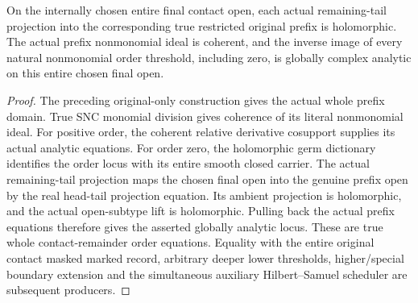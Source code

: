 \begin{theorem}
\label{hir:original-all-level-contact-remainder-prefix-analytic-equations}
\leanok
{}
On the internally chosen entire final contact open, each actual remaining-tail
projection into the corresponding true restricted original prefix is
holomorphic. The actual prefix nonmonomial ideal is coherent, and the inverse
image of every natural nonmonomial order threshold, including zero, is globally
complex analytic on this entire chosen final open.
\end{theorem}
\begin{proof}
The preceding original-only construction gives the actual whole prefix domain.
True SNC monomial division gives coherence of its literal nonmonomial ideal.
For positive order, the coherent relative derivative cosupport supplies its
actual analytic equations. For order zero, the holomorphic germ dictionary
identifies the order locus with its entire smooth closed carrier. The actual
remaining-tail projection maps the chosen final open into the genuine prefix
open by the real head-tail projection equation. Its ambient projection is
holomorphic, and the actual open-subtype lift is holomorphic. Pulling back the
actual prefix equations therefore gives the asserted globally analytic locus.
These are true whole contact-remainder order equations. Equality with the
entire original contact masked marked record, arbitrary deeper lower thresholds,
higher/special boundary extension and the simultaneous auxiliary Hilbert--Samuel
scheduler are subsequent producers.
\end{proof}
